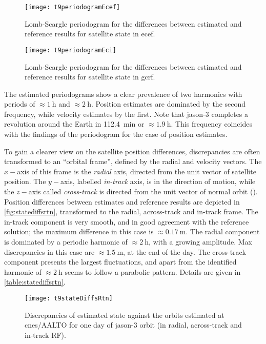 \begin{figure}
    \centering
    \texttt{[image: t9periodogramEcef]}
    \caption{Lomb-Scargle periodogram for the differences between estimated and reference results for satellite state in \gls{ecef}.}
    \label{fig:lsperiodecef}
\end{figure}

\begin{figure}
    \centering
    \texttt{[image: t9periodogramEci]}
    \caption{Lomb-Scargle periodogram for the differences between estimated and reference results for satellite state in \gls{gcrf}.}
    \label{fig:lsperiodeci}
\end{figure}

The estimated periodograms show a clear prevalence of two harmonics with periods of 
$\approx \SI{1}{\hour}$ and $\approx \SI{2}{\hour}$. Position estimates are dominated by 
the second frequency, while velocity estimates by the first. Note that \gls{jason}-3 
completes a revolution around the Earth in \SI{112.4}{\minute} or $\approx \SI{1.9}{\hour}$. 
This frequency coincides with the findings of the periodogram for the case of position 
estimates.

To gain a clearer view on the satellite position differences, discrepancies are often 
transformed to an ``orbital frame'', defined by the radial and velocity vectors. 
The $x-$axis of this frame is the \emph{radial} axis, directed from the unit vector of 
satellite position. The $y-$axis, labelled \emph{in-track} axis, is in the direction 
of motion, while the $z-$axis called \emph{cross-track} is directed from the unit 
vector of normal orbit (\cite{Eunhyouek2019}). Position differences between estimates and 
reference results are depicted in \autoref{fig:statediffsrtn}, transformed to the radial, 
across-track and in-track frame. The in-track component is very smooth, and in good 
agreement with the reference solution; the maximum difference in this case is 
$\approx \SI{0.17}{\meter}$. The radial component is dominated by a periodic harmonic of 
$\approx \SI{2}{\hour}$, with a growing amplitude. Max discrepancies in this case are 
$\approx \SI{1.5}{\meter}$, at the end of the day. The cross-track component presents the 
largest fluctuations, and apart from the identified harmonic of $\approx \SI{2}{\hour}$ 
seems to follow a parabolic pattern. Details are given in \autoref{table:statediffsrtn}.
\begin{figure}
    \centering
    \texttt{[image: t9stateDiffsRtn]}
    \caption{Discrepancies of estimated state against the orbits estimated at \gls{cnes}/AALTO for one day of \gls{jason}-3 orbit (in radial, across-track and in-track RF).}
    \label{fig:statediffsrtn}
\end{figure}

